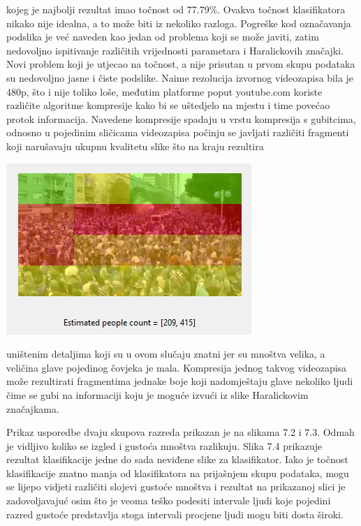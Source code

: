 \documentclass[times, utf8, zavrsni, numeric]{fer}
\begin{document}
\bigbreak

kojeg je najbolji rezultat imao točnost od 77.79\%. Ovakva točnost klasifikatora nikako
nije idealna, a to može biti iz nekoliko razloga. Pogreške kod označavanja podslika je 
već naveden kao jedan od problema koji se može javiti, zatim nedovoljno ispitivanje
različitih vrijednosti parametara i Haralickovih značajki. Novi problem koji je utjecao
na točnost, a nije prisutan u prvom skupu podataka su nedovoljno jasne i čiste podslike.
Naime rezolucija izvornog videozapisa bila je 480p, što i nije toliko loše, međutim platforme 
poput youtube.com koriste različite algoritme kompresije kako bi se uštedjelo na mjestu i 
time povećao protok informacija. Navedene kompresije spadaju u vrstu kompresija s gubitcima, 
odnosno u pojedinim sličicama videozapisa počinju se javljati različiti fragmenti koji narušavaju 
ukupnu kvalitetu slike što na kraju rezultira

\bigbreak

\begin{minipage}{\linewidth}
\centering
\includegraphics{img/clas2.png}
\end{minipage}

\noindent uništenim detaljima koji su u ovom slučaju znatni jer su mnoštva velika, a veličina glave 
pojedinog čovjeka je mala. Kompresija jednog takvog videozapisa može rezultirati 
fragmentima jednake boje koji nadomještaju glave nekoliko
ljudi čime se gubi na informaciji koju je moguće izvući iz slike Haralickovim značajkama.

\bigbreak

Prikaz usporedbe dvaju skupova razreda prikazan je na slikama 7.2 i 7.3. Odmah je vidljivo 
koliko se izgled i gustoća mnoštva razlikuju. Slika 7.4 prikazuje rezultat klasifikacije jedne do sada
neviđene slike za klasifikator. Iako je točnost klasifikacije znatno manja od klasifikatora na prijašnjem
skupu podataka, mogu se lijepo vidjeti različiti slojevi gustoće mnoštva i rezultat na prikazanoj slici
je zadovoljavajuć osim što je veoma teško podesiti intervale ljudi koje pojedini razred gustoće 
predstavlja stoga intervali procjene ljudi mogu biti dosta široki. 
\end{document}
